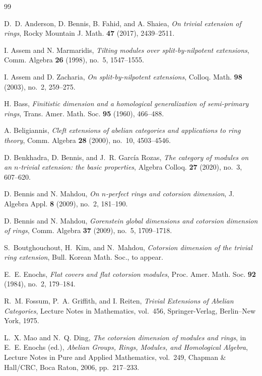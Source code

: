 \documentclass[11pt,reqno]{amsart}
\theoremstyle{plain}
\theoremstyle{definition}
\theoremstyle{remark}
\begin{document}
\begin{thebibliography}{99}
\small

D.~D. Anderson, D. Bennis, B. Fahid, and A. Shaiea,
\emph{On trivial extension of rings},
Rocky Mountain J. Math. \textbf{47} (2017), 2439--2511.

I. Assem and N. Marmaridis,
\emph{Tilting modules over split-by-nilpotent extensions},
Comm. Algebra \textbf{26} (1998), no.~5, 1547--1555.

I. Assem and D. Zacharia,
\emph{On split-by-nilpotent extensions},
Colloq. Math. \textbf{98} (2003), no.~2, 259--275.

H. Bass,
\emph{Finitistic dimension and a homological generalization of semi-primary rings},
Trans. Amer. Math. Soc. \textbf{95} (1960), 466--488.

A. Beligiannis,
\emph{Cleft extensions of abelian categories and applications to ring theory},
Comm. Algebra \textbf{28} (2000), no.~10, 4503--4546.

D. Benkhadra, D. Bennis, and J.~R. Garc\'ia Rozas,
\emph{The category of modules on an $n$-trivial extension: the basic properties},
Algebra Colloq. \textbf{27} (2020), no.~3, 607--620.

D. Bennis and N. Mahdou,
\emph{On $n$-perfect rings and cotorsion dimension},
J. Algebra Appl. \textbf{8} (2009), no.~2, 181--190.

D. Bennis and N. Mahdou,
\emph{Gorenstein global dimensions and cotorsion dimension of rings},
Comm. Algebra \textbf{37} (2009), no.~5, 1709--1718.

S.~Boutghouchout, H.~Kim, and N.~Mahdou,
\emph{Cotorsion dimension of the trivial ring extension},
Bull. Korean Math. Soc., to appear.

E.~E. Enochs,
\emph{Flat covers and flat cotorsion modules},
Proc. Amer. Math. Soc. \textbf{92} (1984), no.~2, 179--184.

R.~M. Fossum, P.~A. Griffith, and I. Reiten,
\emph{Trivial Extensions of Abelian Categories},
Lecture Notes in Mathematics, vol.~456, Springer-Verlag, Berlin--New York, 1975.

L.~X. Mao and N.~Q. Ding,
\emph{The cotorsion dimension of modules and rings},
in E.~E. Enochs (ed.), \emph{Abelian Groups, Rings, Modules, and Homological Algebra},
Lecture Notes in Pure and Applied Mathematics, vol.~249,
Chapman \& Hall/CRC, Boca Raton, 2006, pp.~217--233.


\end{thebibliography}
\end{document}
